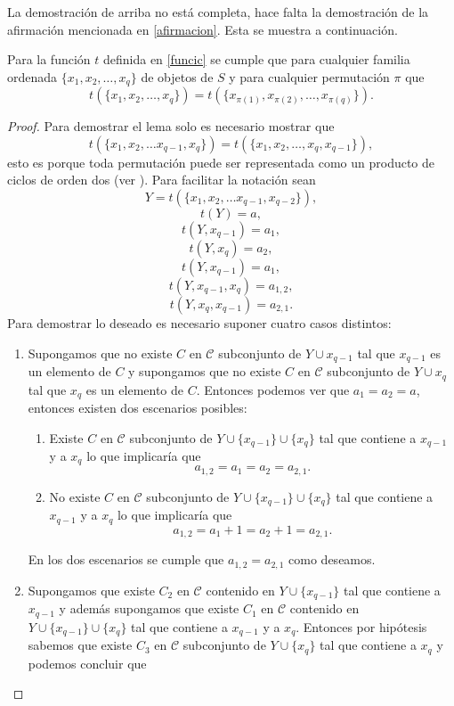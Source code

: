 La demostración de arriba no está completa, hace falta la demostración de la afirmación mencionada en \ref{afirmacion}. Esta se muestra a continuación.

\begin{lem}
Para la función $t$ definida en \ref{funcic} se cumple que para cualquier familia ordenada $\{x_1,x_2,\dots,x_q\}$ de objetos de $S$ y para cualquier permutación $\pi$ que 
$$t(\{x_1,x_2,\dots,x_q\}) = t(\{x_{\pi(1)},x_{\pi(2)},\dots,x_{\pi(q)}\}).$$
\end{lem}

\begin{proof}
Para demostrar el lema solo es necesario mostrar que 
$$t(\{x_1,x_2,\dots x_{q-1},x_q\}) = t(\{x_1,x_2,\dots,x_q,x_{q-1}\}), $$
esto es porque toda permutación puede ser representada como un producto de ciclos de orden dos (ver \cite{moderna}). Para facilitar la notación sean 
$$Y = t(\{x_1,x_2,\dots x_{q-1},x_{q-2}\}),$$
$$t(Y)=a,$$
$$t(Y,x_{q-1}) = a_1,$$
$$t(Y,x_{q}) = a_2,$$
$$t(Y,x_{q-1}) = a_1,$$
$$t(Y,x_{q-1},x_q) = a_{1,2},$$
$$t(Y,x_{q},x_{q-1}) = a_{2,1}.$$
Para demostrar lo deseado es necesario suponer cuatro casos distintos:
\begin{enumerate}
\item Supongamos que no existe $C$ en $\mathcal{C}$ subconjunto de $Y \cup {x_{q-1}}$ tal que $x_{q-1}$ es un elemento de $C$ y supongamos que no existe $C$ en $\mathcal{C}$ subconjunto de $Y \cup {x_{q}}$ tal que $x_{q}$ es un elemento de $C$. Entonces podemos ver que $a_1 = a_2 = a$, entonces existen dos escenarios posibles: 
\begin{enumerate}
\item Existe $C$ en $\mathcal{C}$ subconjunto de $Y \cup \{ x_{q-1}\} \cup \{x_q\}$ tal que contiene a $x_{q-1}$ y a $x_q$ lo que implicaría que $$a_{1,2}=a_1 =a_2 = a_{2,1}.$$
\item No existe $C$ en $\mathcal{C}$ subconjunto de $Y \cup \{ x_{q-1}\} \cup \{x_q\}$ tal que contiene a $x_{q-1}$ y a $x_q$ lo que implicaría que $$a_{1,2}=a_1 +1 =a_2 +1 = a_{2,1}.$$
\end{enumerate}
En los dos escenarios se cumple que $a_{1,2}=a_{2,1}$ como deseamos. 
\item Supongamos que existe $C_2$ en $\mathcal{C}$ contenido en $Y \cup \{ x_{q-1}\}$ tal que contiene a $x_{q-1}$ y además supongamos que existe $C_1$ en $\mathcal{C}$ contenido en $Y \cup \{ x_{q-1}\} \cup \{x_q\}$ tal que contiene a $x_{q-1}$ y a $x_q$. Entonces por hipótesis sabemos que existe $C_3$ en $\mathcal{C}$ subconjunto de $Y \cup \{ x_{q}\}$ tal que contiene a $x_{q}$ y podemos concluir que 

\end{enumerate}
\end{proof}
